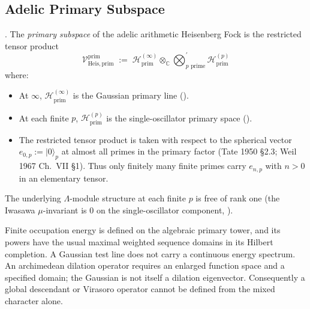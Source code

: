 \subsection{Adelic Primary Subspace}
\label{v4-arith:prim-zeta:adelic-primary}

\begin{definition}
\label{v4-arith:prim-zeta:def:primary-subspace}
\ClaimStatusDefinitional. The \emph{primary subspace} of the adelic
arithmetic Heisenberg Fock is the restricted tensor product
\begin{equation}
\label{v4-arith:prim-zeta:eq:adelic-primary}
\mathcal{V}^{\mathrm{prim}}_{\mathrm{Heis},\mathrm{prim}}\;:=\;
\mathcal{H}^{(\infty)}_{\mathrm{prim}}\otimes_{\mathbb{C}}\bigotimes_{p\text{ prime}}^{\prime}\mathcal{H}^{(p)}_{\mathrm{prim}}
\end{equation}
where:
\begin{itemize}
\item At \(\infty\), \(\mathcal{H}^{(\infty)}_{\mathrm{prim}}\) is the
Gaussian primary line
().
\item At each finite \(p\), \(\mathcal{H}^{(p)}_{\mathrm{prim}}\) is
the single-oscillator primary space
().
\item The restricted tensor product is taken with respect to the
spherical vector \(e_{0,p}:=|0\rangle_{p}\) at almost all primes in
the primary factor (Tate 1950 \S2.3; Weil 1967 Ch.~VII \S1).
Thus only finitely many finite primes carry \(e_{n,p}\) with
\(n>0\) in an elementary tensor.
\end{itemize}
The underlying \(\Lambda\)-module structure at each finite \(p\) is
free of rank one
(the Iwasawa \(\mu\)-invariant is \(0\) on the single-oscillator
component, ).
\end{definition}

\begin{remark}
\label{v4-arith:prim-zeta:rem:consistency-vb}
Finite occupation energy is defined on the algebraic primary tower,
and its powers have the usual maximal weighted sequence domains in its
Hilbert completion. A Gaussian test line does not carry a continuous
energy spectrum. An archimedean dilation operator requires an enlarged
function space and a specified domain; the Gaussian is not itself a
dilation eigenvector. Consequently a global descendant or Virasoro
operator cannot be defined from the mixed character alone.
\end{remark}

